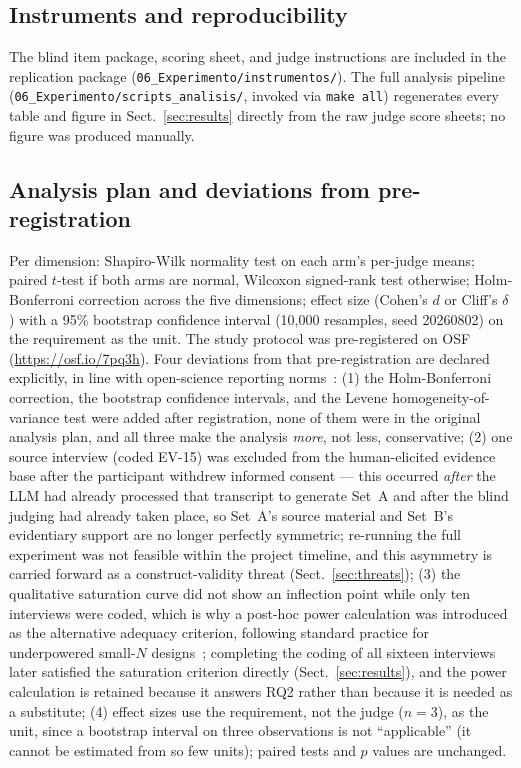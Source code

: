 \documentclass{llncs}
\begin{document}
\subsection{Instruments and reproducibility}
The blind item package, scoring sheet, and judge instructions are included in the
replication package (\nolinkurl{06_Experimento/instrumentos/}). The full analysis
pipeline (\nolinkurl{06_Experimento/scripts_analisis/}, invoked via \texttt{make all})
regenerates every table and figure in Sect.~\ref{sec:results} directly from the raw
judge score sheets; no figure was produced manually.

\subsection{Analysis plan and deviations from pre-registration}
\label{sec:deviations}
Per dimension: Shapiro-Wilk normality test on each arm's per-judge means; paired
$t$-test if both arms are normal, Wilcoxon signed-rank test otherwise; Holm-Bonferroni
correction across the five dimensions; effect size (Cohen's $d$ or Cliff's $\delta$)
with a 95\% bootstrap confidence interval (10{,}000 resamples, seed 20260802) on the
requirement as the unit. The
study protocol was pre-registered on OSF (\url{https://osf.io/7pq3h}). Four deviations
from that pre-registration are declared explicitly, in line with open-science
reporting norms~\cite{nosek2018preregistration}: (1) the Holm-Bonferroni correction,
the bootstrap confidence intervals, and the Levene homogeneity-of-variance test were
added after registration, none of them were in the original analysis plan, and all
three make the analysis \emph{more}, not less, conservative; (2) one source interview
(coded EV-15) was excluded from the human-elicited evidence base after the participant
withdrew informed consent --- this occurred \emph{after} the LLM had already processed
that transcript to generate Set~A and after the blind judging had already taken place,
so Set~A's source material and Set~B's evidentiary support are no longer perfectly
symmetric; re-running the full experiment was not feasible within the project timeline,
and this asymmetry is carried forward as a construct-validity threat
(Sect.~\ref{sec:threats}); (3) the qualitative saturation curve did not show an inflection
point while only ten interviews were coded, which is why a post-hoc power calculation was
introduced as the alternative adequacy criterion, following standard practice for
underpowered small-$N$ designs~\cite{molleri2020empirically}; completing the coding of all
sixteen interviews later satisfied the saturation criterion directly
(Sect.~\ref{sec:results}), and the power calculation is retained because it answers RQ2
rather than because it is needed as a substitute; (4) effect sizes use the requirement, not
the judge ($n=3$), as the unit, since a bootstrap interval on three observations is not
``applicable'' (it cannot be estimated from so few units); paired tests and $p$ values are
unchanged.
\end{document}
